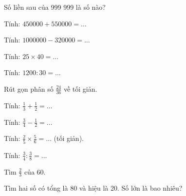 \begin{ex}
Số liền sau của 999 999 là số nào?
\end{ex}

\begin{ex}
Tính: $450000 + 550000 = \dots$
\end{ex}

\begin{ex}
Tính: $1000000 - 320000 = \dots$
\end{ex}

\begin{ex}
Tính: $25 \times 40 = \dots$
\end{ex}

\begin{ex}
Tính: $1200 : 30 = \dots$
\end{ex}

\begin{ex}
Rút gọn phân số $\frac{24}{36}$ về tối giản.
\end{ex}

\begin{ex}
Tính: $\frac{1}{3} + \frac{1}{2} = \dots$
\end{ex}

\begin{ex}
Tính: $\frac{3}{4} - \frac{1}{2} = \dots$
\end{ex}

\begin{ex}
Tính: $\frac{2}{5} \times \frac{5}{6} = \dots$ (tối giản).
\end{ex}

\begin{ex}
Tính: $\frac{3}{4} : \frac{3}{8} = \dots$
\end{ex}

\begin{ex}
Tìm $\frac{2}{3}$ của 60.
\end{ex}

\begin{ex}
Tìm hai số có tổng là 80 và hiệu là 20. Số lớn là bao nhiêu?
\end{ex}

